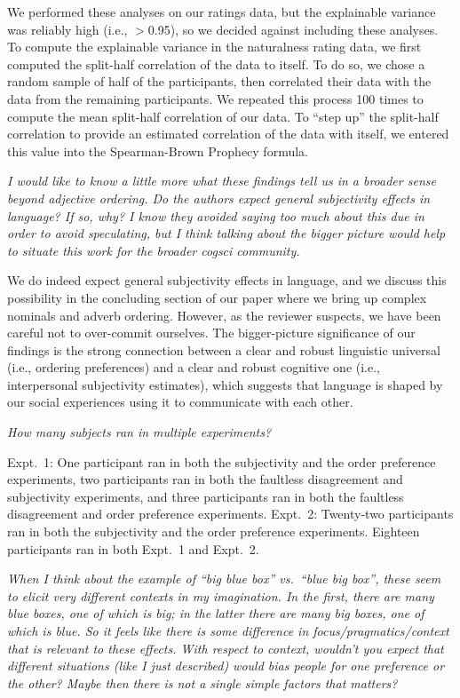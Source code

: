 \documentclass[12pt]{article}
\begin{document}
We performed these analyses on our ratings data, but the explainable variance was reliably high (i.e., $>$0.95), so we decided against including these analyses. To compute the explainable variance in the naturalness rating data, we first computed the split-half correlation of the data to itself. To do so, we chose a random sample of half of the participants, then correlated their data with the data from the remaining participants. We repeated this process 100 times to compute the mean split-half correlation of our data. To ``step up'' the split-half correlation to provide an estimated correlation of the data with itself, we entered this value into the Spearman-Brown Prophecy formula.

\item \emph{I would like to know a little more what these findings tell us in a broader sense beyond adjective ordering. Do the authors expect general subjectivity effects in language? If so, why? I know they avoided saying too much about this due in order to avoid speculating, but I think talking about the bigger picture would help to situate this work for the broader cogsci community.} 

We do indeed expect general subjectivity effects in language, and we discuss this possibility in the concluding section of our paper where we bring up complex nominals and adverb ordering. However, as the reviewer suspects, we have been careful not to over-commit ourselves. The bigger-picture significance of our findings is the strong connection between a clear and robust linguistic universal (i.e., ordering preferences) and a clear and robust cognitive one (i.e., interpersonal subjectivity estimates), which suggests that language is shaped by our social experiences using it to communicate with each other.

\item \emph{How many subjects ran in multiple experiments?}

Expt.~1: One participant ran in both the subjectivity and the order preference experiments, two participants ran in both the faultless disagreement and subjectivity experiments, and three participants ran in both the faultless disagreement and order preference experiments. Expt.~2: Twenty-two participants ran in both the subjectivity and the order preference experiments. Eighteen participants ran in both Expt.~1 and Expt.~2.

\item \emph{When I think about the example of ``big blue box'' vs.~``blue big box'', these seem to elicit very different contexts in my imagination. In the first, there are many blue boxes, one of which is big; in the latter there are many big boxes, one of which is blue. So it feels like there is some difference in focus/pragmatics/context that is relevant to these effects. With respect to context, wouldn't you expect that different situations (like I just described) would bias people for one preference or the other? Maybe then there is not a single simple factors that matters?}
\end{document}
